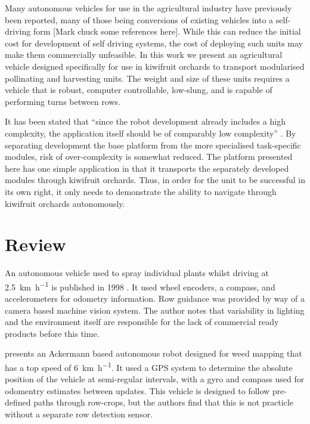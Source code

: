 \documentclass[preprint,authoryear,12pt]{elsarticle}
\begin{document}
    Many autonomous vehicles for use in the agricultural industry have previously been reported, many of those being conversions of existing vehicles into a self-driving form [Mark chuck some references here].
    While this can reduce the initial cost for development of self driving systems, the cost of deploying such units may make them commercially unfeasible.
    In this work we present an agricultural vehicle designed specifically for use in kiwifruit orchards to transport modularised pollinating and harvesting units.
    The weight and size of these units requires a vehicle that is robust, computer controllable, low-slung, and is capable of performing turns between rows.

    It has been stated that ``since the robot development already includes a high complexity, the application itself should be of comparably low complexity'' \citep{Ruckelshausen2009}.
    By separating development the base platform from the more specialised task-specific modules, risk of over-complexity is somewhat reduced.
    The platform presented here has one simple application in that it transports the separately developed modules through kiwifruit orchards.
    Thus, in order for the unit to be successful in its own right, it only needs to demonstrate the ability to navigate through kiwifruit orchards autonomously.

\section{Review}
\label{sect:review}

    
    An autonomous vehicle used to spray individual plants whilst driving at \SI{2.5}{\kilo\meter\per\hour} is published in 1998 \citep{Tillett1998}.
    It used wheel encoders, a compass, and accelerometers for odometry information.
    Row guidance was provided by way of a camera based machine vision system.
    The author notes that variability in lighting and the environment itself are responsible for the lack of commercial ready products before this time.
    

     presents an Ackermann based autonomous robot designed for weed mapping that has a top speed of \SI{6}{\kilo\meter\per\hour}.
    It used a GPS system to determine the absolute position of the vehicle at semi-regular intervals, with a gyro and compass used for odomentry estimates between updates.
    This vehicle is designed to follow pre-defined paths through row-crops, but the authors find that this is not practicle without a separate row detection sensor.
\end{document}

